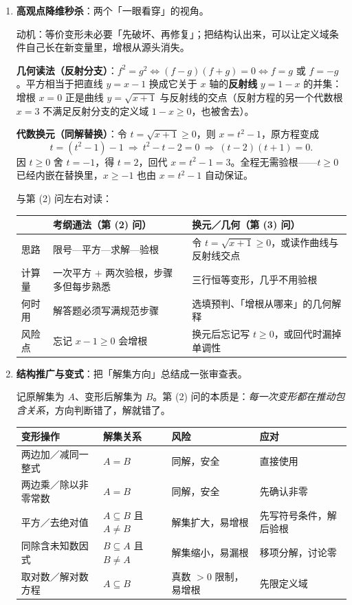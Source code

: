 \begin{tcolorbox}
\begin{enumerate}[label=(\arabic*), itemsep=4pt]
\item \textbf{高观点降维秒杀}：两个「一眼看穿」的视角。

动机：等价变形未必要「先破坏、再修复」；把结构认出来，可以让定义域条件自己长在新变量里，增根从源头消失。

\textbf{几何读法（反射分支）}：$f^2=g^2\iff(f-g)(f+g)=0\iff f=g$ 或 $f=-g$。平方相当于把直线 $y=x-1$ 换成它关于 $x$ 轴的\textbf{反射线} $y=1-x$ 的并集：增根 $x=0$ 正是曲线 $y=\sqrt{x+1}$ 与反射线的交点（反射方程的另一个代数根 $x=3$ 不满足反射分支的定义域 $1-x\ge0$，也被舍去）。

\textbf{代数换元（同解替换）}：令 $t=\sqrt{x+1}\ge0$，则 $x=t^2-1$，原方程变成
\[
t=(t^2-1)-1\ \Longrightarrow\ t^2-t-2=0\ \Longrightarrow\ (t-2)(t+1)=0 .
\]
因 $t\ge0$ 舍 $t=-1$，得 $t=2$，回代 $x=t^2-1=3$。全程无需验根——$t\ge0$ 已经内嵌在替换里，$x\ge-1$ 也由 $x=t^2-1$ 自动保证。

与第 (2) 问左右对读：
\begin{center}\small
\begin{tabular}{p{2.4cm}|p{5.6cm}|p{5.6cm}}
\hline
 & 考纲通法（第 (2) 问） & 换元／几何（第 (3) 问）\\
\hline
思路 & 限号—平方—求解—验根 & 令 $t=\sqrt{x+1}\ge0$，或读作曲线与反射线交点 \\
计算量 & 一次平方 $+$ 两次验根，步骤多但每步熟悉 & 三行恒等变形，几乎不用验根 \\
何时用 & 解答题必须写满规范步骤 & 选填预判、「增根从哪来」的几何解释 \\
风险点 & 忘记 $x-1\ge0$ 会增根 & 换元后忘记写 $t\ge0$，或回代时漏掉单调性 \\
\hline
\end{tabular}
\end{center}

\item \textbf{结构推广与变式}：把「解集方向」总结成一张审查表。

\begin{advancedonly}
记原解集为 $A$、变形后解集为 $B$。第 (2) 问的本质是：\emph{每一次变形都在推动包含关系}，方向判断错了，解就错了。

\begin{center}\small
\begin{tabular}{p{3.0cm}p{2.9cm}p{3.2cm}p{3.2cm}}
\hline
变形操作 & 解集关系 & 风险 & 应对 \\
\hline
两边加／减同一整式 & $A=B$ & 同解，安全 & 直接使用 \\
两边乘／除以非零常数 & $A=B$ & 同解，安全 & 先确认非零 \\
平方／去绝对值 & $A\subseteq B$ 且 $A\ne B$ & 解集扩大，易增根 & 先写符号条件，解后验根 \\
同除含未知数因式 & $B\subseteq A$ 且 $B\ne A$ & 解集缩小，易漏根 & 移项分解，讨论零 \\
取对数／解对数方程 & $A\subseteq B$ & 真数 $>0$ 限制，易增根 & 先限定义域 \\
\hline
\end{tabular}
\end{center}


\end{advancedonly}
\end{enumerate}
\end{tcolorbox}
